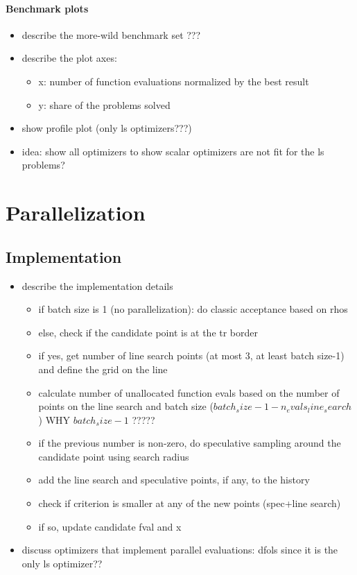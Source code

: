 \paragraph{Benchmark plots}
\begin{itemize}
    \item describe the more-wild benchmark set ???
    \item describe the plot axes:
        \begin{itemize}
            \item x: number of function evaluations normalized by the best result
            \item y: share of the problems solved
        \end{itemize}
    \item show profile plot (only ls optimizers???)
    \item idea: show all optimizers to show scalar optimizers are not fit for the ls problems?
\end{itemize}


\section{Parallelization}
\subsection{Implementation}
\begin{itemize}
\item describe the implementation details
\begin{itemize}
    \item if batch size is 1 (no parallelization): do classic acceptance based on rhos
    \item else, check if the candidate point is at the tr border
    \item if yes, get number of line search points (at most 3, at least batch size-1) and define the grid on the line
    \item calculate number of unallocated function evals based on the number of points on the line search and batch size ($batch_size-1-n_evals_line_search$) WHY $batch_size-1$ ?????
    \item if the previous number is non-zero, do speculative sampling around the candidate point using search radius
    \item add the line search and speculative points, if any, to the history
    \item check if criterion is smaller at any of the new points (spec+line search)
    \item if so, update candidate fval and x
\end{itemize}
\item discuss optimizers that implement parallel evaluations: dfols since it is the only ls optimizer??
\end{itemize}

